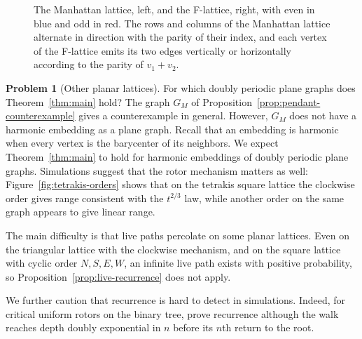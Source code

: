 \documentclass[11pt]{amsart}
\theoremstyle{plain}
\theoremstyle{definition}
\newtheorem{problem}{Problem}
\begin{document}
\begin{figure}[!ht]
		\caption{The Manhattan lattice, left, and the F-lattice, right, with even in
			blue and odd in red.  The rows and columns of the Manhattan lattice
			alternate in direction with the parity of their index, and each vertex of
			the F-lattice emits its two edges vertically or horizontally according to
			the parity of $v_1+v_2$.}
		\label{fig:directed-lattices}
	\end{figure}


	


	\begin{problem}[Other planar lattices]\label{prob:planar}
		For which doubly periodic plane graphs does Theorem~\ref{thm:main} hold?  The
		graph $G_M$ of Proposition~\ref{prop:pendant-counterexample} gives a
		counterexample in general. However, $G_M$ does not have a harmonic embedding
		as a plane graph.  Recall that an embedding is harmonic when every
		vertex is the barycenter of its neighbors. We expect Theorem~\ref{thm:main} to hold for harmonic embeddings of doubly
		periodic plane graphs.  Simulations suggest that the rotor mechanism matters as well:
		Figure~\ref{fig:tetrakis-orders} shows that on the tetrakis square lattice the
		clockwise order gives range consistent with the $t^{2/3}$ law, while another
		order on the same graph appears to give linear range.
		
		The main difficulty is that live paths percolate on some planar lattices.  Even on
		the triangular lattice with the clockwise mechanism, and on the square lattice
		with cyclic order $N,S,E,W$, an infinite live path exists with positive
		probability, so Proposition~\ref{prop:live-recurrence} does not apply.
		
		We further caution that recurrence is hard to detect in simulations.  Indeed,
		for critical uniform rotors on the binary tree,
		\citet[Theorem~7\textup{(i)}]{AngelHolroyd2011} prove recurrence although the
		walk reaches depth doubly exponential in $n$ before its $n$th return to the
			root.
		\end{problem}
\end{document}
